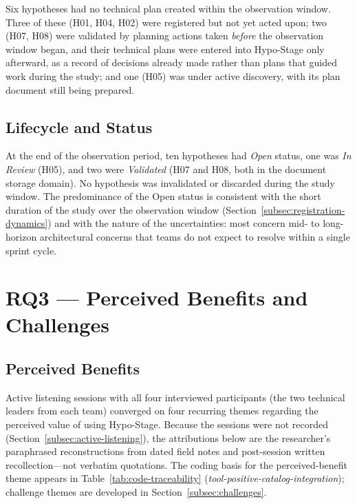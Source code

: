 Six hypotheses had no technical plan created within the observation window. Three
of these (H01, H04, H02) were registered but not yet acted upon; two (H07, H08)
were validated by planning actions taken \textit{before} the observation window
began, and their technical plans were entered into Hypo-Stage only afterward, as
a record of decisions already made rather than plans that guided work during the
study; and one (H05) was under active discovery, with its plan document still
being prepared.

\subsection{Lifecycle and Status}
\label{subsec:lifecycle-status}

At the end of the observation period, ten hypotheses had \textit{Open} status,
one was \textit{In Review} (H05), and two were \textit{Validated} (H07 and H08,
both in the document storage domain). No hypothesis was invalidated or discarded
during the study window. The predominance of the Open status is consistent with
the short duration of the study over the observation window
(Section~\ref{subsec:registration-dynamics}) and with the
nature of the uncertainties: most concern mid- to long-horizon architectural
concerns that teams do not expect to resolve within a single sprint cycle.

\section{RQ3 — Perceived Benefits and Challenges}
\label{sec:rq3-results}
\label{sec:results-rq3}

\subsection{Perceived Benefits}
\label{subsec:benefits}

Active listening sessions with all four interviewed participants (the two
technical leaders from each team) converged on four recurring themes regarding
the perceived value of using Hypo-Stage.
Because the sessions were not recorded
(Section~\ref{subsec:active-listening}), the attributions below are the
researcher's paraphrased reconstructions from dated field notes and
post-session written recollection---not verbatim quotations. The coding basis
for the perceived-benefit theme appears in Table~\ref{tab:code-traceability}
(\textit{tool-positive-catalog-integration}); challenge themes are developed in
Section~\ref{subsec:challenges}.

